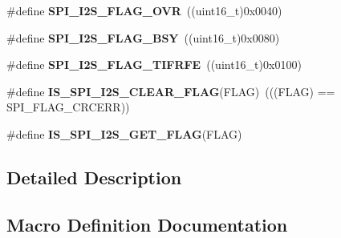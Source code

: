 \begin{DoxyCompactItemize}
\item 
\hypertarget{group___s_p_i___i2_s__flags__definition_ga42001f769835f133600a021a29764254}{}\#define {\bfseries S\+P\+I\+\_\+\+I2\+S\+\_\+\+F\+L\+A\+G\+\_\+\+O\+V\+R}~((uint16\+\_\+t)0x0040)\label{group___s_p_i___i2_s__flags__definition_ga42001f769835f133600a021a29764254}

\item 
\hypertarget{group___s_p_i___i2_s__flags__definition_ga4551095df1365cf2a760282a34279b3c}{}\#define {\bfseries S\+P\+I\+\_\+\+I2\+S\+\_\+\+F\+L\+A\+G\+\_\+\+B\+S\+Y}~((uint16\+\_\+t)0x0080)\label{group___s_p_i___i2_s__flags__definition_ga4551095df1365cf2a760282a34279b3c}

\item 
\hypertarget{group___s_p_i___i2_s__flags__definition_gae5996e849f4178d77520f26a34be4733}{}\#define {\bfseries S\+P\+I\+\_\+\+I2\+S\+\_\+\+F\+L\+A\+G\+\_\+\+T\+I\+F\+R\+F\+E}~((uint16\+\_\+t)0x0100)\label{group___s_p_i___i2_s__flags__definition_gae5996e849f4178d77520f26a34be4733}

\item 
\hypertarget{group___s_p_i___i2_s__flags__definition_gab16c7f47712871b8f1b97de43841856f}{}\#define {\bfseries I\+S\+\_\+\+S\+P\+I\+\_\+\+I2\+S\+\_\+\+C\+L\+E\+A\+R\+\_\+\+F\+L\+A\+G}(F\+L\+A\+G)~(((F\+L\+A\+G) == S\+P\+I\+\_\+\+F\+L\+A\+G\+\_\+\+C\+R\+C\+E\+R\+R))\label{group___s_p_i___i2_s__flags__definition_gab16c7f47712871b8f1b97de43841856f}

\item 
\#define {\bfseries I\+S\+\_\+\+S\+P\+I\+\_\+\+I2\+S\+\_\+\+G\+E\+T\+\_\+\+F\+L\+A\+G}(F\+L\+A\+G)
\end{DoxyCompactItemize}


\subsection{Detailed Description}


\subsection{Macro Definition Documentation}
\hypertarget{group___s_p_i___i2_s__flags__definition_ga1241471a018bc63ed140089ce8334b4f}{}
